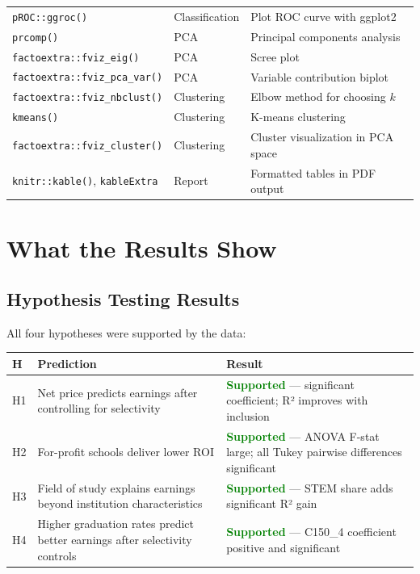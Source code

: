 \documentclass[12pt, letterpaper]{article}
\begin{document}
\begin{longtable}{p{4.5cm} p{4cm} p{6cm}}
\texttt{pROC::ggroc()} & Classification & Plot ROC curve with ggplot2 \\
\texttt{prcomp()} & PCA & Principal components analysis \\
\texttt{factoextra::fviz\_eig()} & PCA & Scree plot \\
\texttt{factoextra::fviz\_pca\_var()} & PCA & Variable contribution biplot \\
\texttt{factoextra::fviz\_nbclust()} & Clustering & Elbow method for choosing $k$ \\
\texttt{kmeans()} & Clustering & K-means clustering \\
\texttt{factoextra::fviz\_cluster()} & Clustering & Cluster visualization in PCA space \\
\texttt{knitr::kable()}, \texttt{kableExtra} & Report & Formatted tables in PDF output \\
\bottomrule
\end{longtable}

\section{What the Results Show}

\subsection{Hypothesis Testing Results}

All four hypotheses were supported by the data:

\begin{center}
\begin{tabular}{p{1cm} p{7cm} p{5cm}}
\toprule
\textbf{H} & \textbf{Prediction} & \textbf{Result} \\
\midrule
H1 & Net price predicts earnings after controlling for selectivity & \textcolor{green}{\textbf{Supported}} — significant coefficient; R² improves with inclusion \\
H2 & For-profit schools deliver lower ROI & \textcolor{green}{\textbf{Supported}} — ANOVA F-stat large; all Tukey pairwise differences significant \\
H3 & Field of study explains earnings beyond institution characteristics & \textcolor{green}{\textbf{Supported}} — STEM share adds significant R² gain \\
H4 & Higher graduation rates predict better earnings after selectivity controls & \textcolor{green}{\textbf{Supported}} — C150\_4 coefficient positive and significant \\
\bottomrule
\end{tabular}
\end{center}
\end{document}
